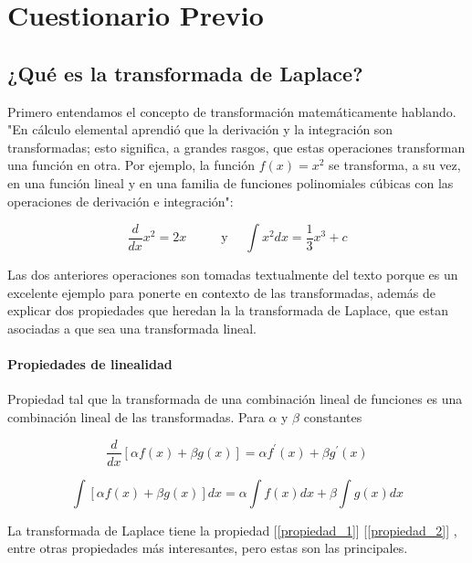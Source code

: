 \section{Cuestionario Previo}

\noindent \justifying

\subsection{¿Qué es la transformada de Laplace?}

Primero entendamos el concepto de transformación matemáticamente hablando.
"En cálculo elemental aprendió que la derivación y la integración son transformadas; esto significa, a grandes rasgos, que estas operaciones transforman una función en otra. Por ejemplo, la función $f(x)=x^{2}$ se transforma, a su vez, en una función lineal y en una familia de funciones polinomiales cúbicas con las operaciones de derivación e integración":


\begin{equation}
		\frac{d}{d x} x^{2}=2 x \hspace{1cm}
		\text { y } \quad \int x^{2} d x=\frac{1}{3} x^{3}+c
\end{equation}

Las dos anteriores operaciones son   tomadas textualmente del texto  porque es un excelente ejemplo para ponerte en contexto de las transformadas, además de explicar dos propiedades que heredan la la transformada de Laplace, que estan asociadas a que sea una transformada lineal.

\paragraph*{Propiedades de linealidad}

Propiedad  tal que la transformada de una combinación lineal de funciones es una combinación lineal de las transformadas. Para $\alpha$ y $\beta$ constantes

\begin{equation}
	\frac{d}{d x}[\alpha f(x)+\beta g(x)]=\alpha f^{\prime}(x)+\beta g^{\prime}(x)
	\label{propiedad_1}
\end{equation}

\begin{equation}
	\int[\alpha f(x)+\beta g(x)] d x=\alpha \int f(x) d x+\beta \int g(x) d x
	\label{propiedad_2}
\end{equation}

La transformada de Laplace tiene la propiedad [\ref{propiedad_1}] [\ref{propiedad_2}] , entre otras propiedades más interesantes, pero estas son las principales.



